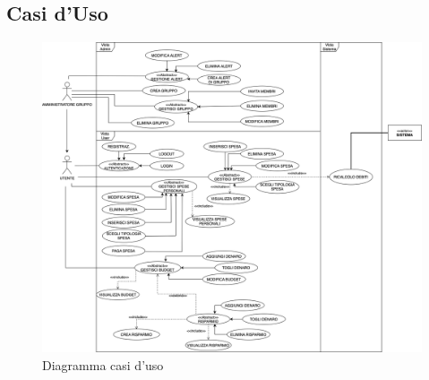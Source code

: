 \subsection{Casi d'Uso}

    \begin{figure}[h]
        \centering
        \includegraphics[width=1\textwidth, trim=3cm 0cm 1cm 0cm]{images/DiagrammaCasiDusoV2.3.png}
        \caption{Diagramma casi d'uso }
    \end{figure}
